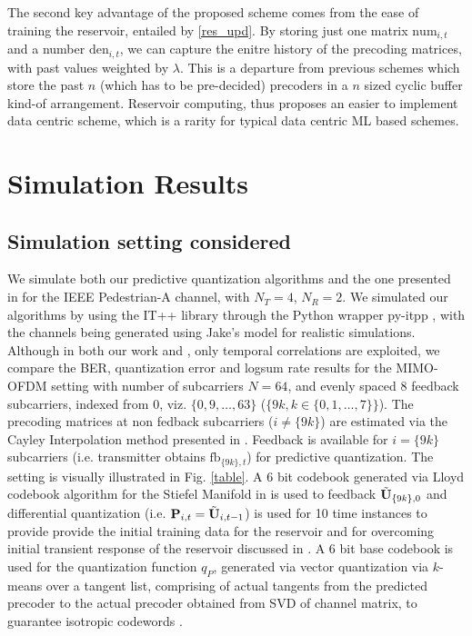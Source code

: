 \documentclass[conference]{IEEEtran}
\begin{document}
The second key advantage of the proposed scheme comes from the ease of training the reservoir, entailed by \eqref{res_upd}.
By storing just one matrix $\text{num}_{i,t}$ and a number $\text{den}_{i,t}$, we can capture the enitre history of the precoding matrices, with past values weighted by $\lambda$.
This is a departure from previous schemes \cite{Gupt1905:Predictive,6891198,6545375} which store the past $n$ (which has to be pre-decided) precoders in a $n$ sized cyclic buffer kind-of arrangement.
Reservoir computing, thus proposes an easier to implement data centric scheme, which is a rarity for typical data centric ML based schemes.


\section{Simulation Results}
\label{section4}
\subsection{Simulation setting considered}
\label{setting}
\noindent We simulate both our predictive quantization algorithms and the one presented in \cite{6891198} for the IEEE Pedestrian-A channel, with $N_T=4$, $N_R=2$. We simulated our algorithms by using the IT++ library through the Python wrapper py-itpp \cite{ViditPy}, with the channels being generated using Jake’s model for realistic simulations. Although in both our work and \cite{6891198}, only temporal correlations are exploited, we compare the BER, quantization error and logsum rate results for the MIMO-OFDM setting with number of subcarriers $N=64$, and evenly spaced $8$ feedback subcarriers, indexed from 0, viz. $\{0,9,\ldots,63\}$ ($\{9k, k \in \{0,1,\ldots,7\}\}$). The precoding matrices at non fedback subcarriers ($i\neq\{9k\}$) are estimated via the Cayley Interpolation method presented in \cite{Gupt1905:Predictive}. Feedback is available for $i=\{9k\}$ subcarriers (i.e. transmitter obtains $\text{fb}_{\{9k\},t}$) for predictive quantization. The setting is visually illustrated in Fig. \ref{table}. A 6 bit codebook generated via Lloyd codebook algorithm for the Stiefel Manifold in \cite{6678348} is used to feedback $\tilde{{\bf U}}_{\{9k\},0}$ and differential quantization (i.e. ${\bf P}_{i,t}=\tilde{{\bf U}}_{i,t-1}$) is used for 10 time instances to provide provide the initial training data for the reservoir and for overcoming initial transient response of the reservoir discussed in \cite{mosleh2017brain}. A 6 bit base codebook is used for the quantization function $q_P$, generated via vector quantization via $k$-means over a tangent list, comprising of actual tangents from the predicted precoder to the actual precoder obtained from SVD of channel matrix, to guarantee isotropic codewords \cite{Gupt1905:Predictive}.
\end{document}
